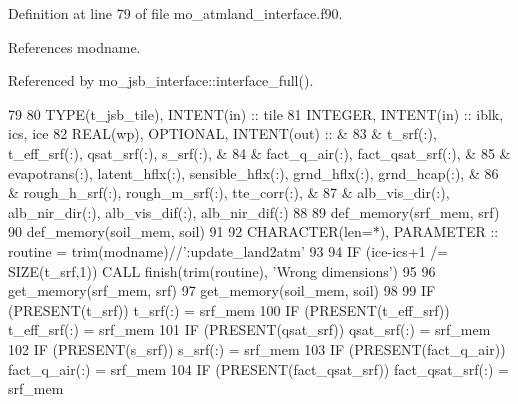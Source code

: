 Definition at line 79 of file mo\+\_\+atmland\+\_\+interface.\+f90.



References modname.



Referenced by mo\+\_\+jsb\+\_\+interface\+::interface\+\_\+full().


\begin{DoxyCode}
79 
80     \textcolor{keywordtype}{TYPE}(t\_jsb\_tile),   \textcolor{keywordtype}{INTENT(in)} :: tile
81     \textcolor{keywordtype}{INTEGER},            \textcolor{keywordtype}{INTENT(in)} :: iblk, ics, ice
82     \textcolor{keywordtype}{REAL(wp)}, \textcolor{keywordtype}{OPTIONAL}, \textcolor{keywordtype}{INTENT(out)} ::                                               &
83       & t\_srf(:), t\_eff\_srf(:), qsat\_srf(:), s\_srf(:),                               &
84       & fact\_q\_air(:), fact\_qsat\_srf(:),                                             &
85       & evapotrans(:), latent\_hflx(:), sensible\_hflx(:), grnd\_hflx(:), grnd\_hcap(:), &
86       & rough\_h\_srf(:), rough\_m\_srf(:), tte\_corr(:),                                 &
87       & alb\_vis\_dir(:), alb\_nir\_dir(:), alb\_vis\_dif(:), alb\_nir\_dif(:)
88 
89     def\_memory(srf\_mem, srf)
90     def\_memory(soil\_mem, soil)
91 
92     \textcolor{keywordtype}{CHARACTER(len=*)}, \textcolor{keywordtype}{PARAMETER} :: routine = trim(modname)//\textcolor{stringliteral}{':update\_land2atm'}
93 
94     \textcolor{keywordflow}{IF} (ice-ics+1 /= \textcolor{keyword}{SIZE}(t\_srf,1)) \textcolor{keyword}{CALL }finish(trim(routine), \textcolor{stringliteral}{'Wrong dimensions'})
95 
96     get\_memory(srf\_mem, srf)
97     get\_memory(soil\_mem, soil)
98 
99     \textcolor{keywordflow}{IF} (\textcolor{keyword}{PRESENT}(t\_srf))           t\_srf(:)            = srf\_mem  %
100     \textcolor{keywordflow}{IF} (\textcolor{keyword}{PRESENT}(t\_eff\_srf))       t\_eff\_srf(:)        = srf\_mem  %
101     \textcolor{keywordflow}{IF} (\textcolor{keyword}{PRESENT}(qsat\_srf))        qsat\_srf(:)         = srf\_mem  %
102     \textcolor{keywordflow}{IF} (\textcolor{keyword}{PRESENT}(s\_srf))           s\_srf(:)            = srf\_mem  %
103     \textcolor{keywordflow}{IF} (\textcolor{keyword}{PRESENT}(fact\_q\_air))      fact\_q\_air(:)       = srf\_mem  %
104     \textcolor{keywordflow}{IF} (\textcolor{keyword}{PRESENT}(fact\_qsat\_srf))   fact\_qsat\_srf(:)    = srf\_mem  %

\end{DoxyCode}
